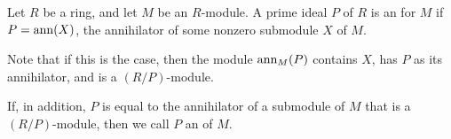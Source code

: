 \documentclass[12pt]{article}
\begin{document}
Let $R$ be a ring, 
and let $M$ be an $R$-module.
A prime ideal $P$ of $R$ 
is an {} for $M$
if $P={\rm ann}(X)$, the annihilator of some nonzero submodule $X$ of $M$.

Note that if this is the case, then the module ${\rm ann}_M(P)$ contains $X$, has $P$ as its annihilator,
and is a  $(R/P)$-module.

If, in addition, $P$ is equal to the annihilator of a submodule of $M$ that is a  $(R/P)$-module, then we call $P$ an {} of $M$.
\end{document}
